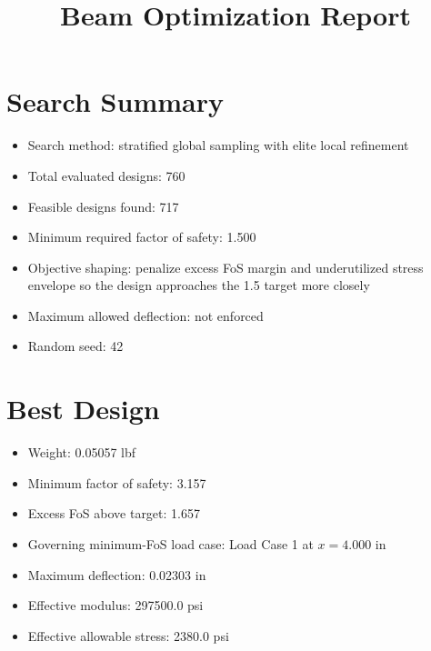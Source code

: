 \documentclass[11pt]{article}
\title{Beam Optimization Report}
\date{}
\begin{document}
\maketitle

\section*{Search Summary}
\begin{itemize}
\item Search method: stratified global sampling with elite local refinement
\item Total evaluated designs: 760
\item Feasible designs found: 717
\item Minimum required factor of safety: 1.500
\item Objective shaping: penalize excess FoS margin and underutilized stress envelope so the design approaches the 1.5 target more closely
\item Maximum allowed deflection: not enforced
\item Random seed: 42
\end{itemize}

\section*{Best Design}
\begin{itemize}
\item Weight: 0.05057 lbf
\item Minimum factor of safety: 3.157
\item Excess FoS above target: 1.657
\item Governing minimum-FoS load case: Load Case 1 at $x=4.000$ in
\item Maximum deflection: 0.02303 in
\item Effective modulus: 297500.0 psi
\item Effective allowable stress: 2380.0 psi
\end{itemize}
\end{document}
